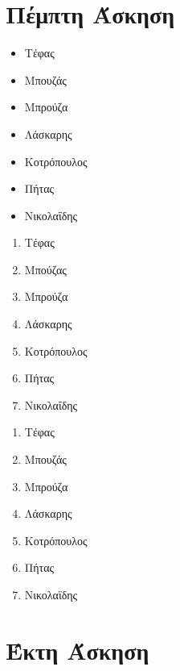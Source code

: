 \documentclass[a4paper,11pt]{article}
\begin{document}
\section{Πέμπτη Άσκηση}

\begin{itemize}  
\item Τέφας
\item Μπουζάς
\item Μπρούζα
\item Λάσκαρης
\item Κοτρόπουλος
\item Πήτας
\item Νικολαΐδης
\end{itemize}

\begin{enumerate}
\item Τέφας
\item Μπούζας
\item Μπρούζα
\item Λάσκαρης
\item Κοτρόπουλος
\item Πήτας
\item  Νικολαΐδης
\end{enumerate}

\begin{enumerate}[label=\textbf(\textbf{\greek*}\textbf)]
\item Τέφας
\item Μπουζάς
\item Μπρούζα
\item Λάσκαρης
\item Κοτρόπουλος
\item Πήτας
\item Νικολαϊδης
\end{enumerate}

\section{Έκτη Άσκηση}
\end{document}
